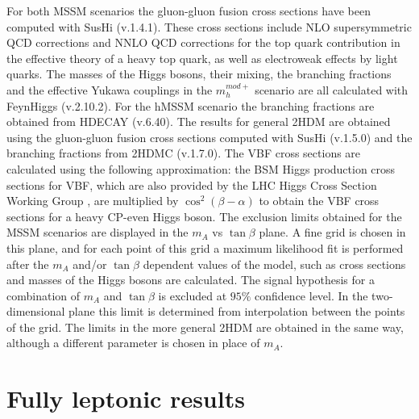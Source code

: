 For both MSSM scenarios the gluon-gluon fusion cross sections have been computed with SusHi (v.1.4.1)\cite{Harlander:2012pb}. These cross sections include NLO supersymmetric QCD corrections and NNLO QCD corrections for the top quark contribution in the effective theory of a heavy top quark, as well as electroweak effects by light quarks. The masses of the Higgs bosons, their mixing, the branching fractions and the effective Yukawa couplings in the $m_{h}^{mod+}$ scenario are all calculated with FeynHiggs (v.2.10.2)\cite{Heinemeyer:1998yj, Heinemeyer:1998np, Degrassi:2002fi, Frank:2006yh, Hahn:2013ria}. For the hMSSM scenario the branching fractions are obtained from HDECAY (v.6.40)\cite{Djouadi:1997yw, Djouadi:2006bz}. The results for general 2HDM are obtained using the gluon-gluon fusion cross sections computed with SusHi (v.1.5.0) and the branching fractions from 2HDMC (v.1.7.0)\cite{Rathsman:2011yv}. The VBF cross sections are calculated using the following approximation: the BSM Higgs production cross sections for VBF, which are also provided by the LHC Higgs Cross Section Working Group \cite{bsmhiggsxsecs2}, are multiplied by $\cos^{2}(\beta-\alpha)$ to obtain the VBF cross sections for a heavy CP-even Higgs boson.\newline
The exclusion limits obtained for the MSSM scenarios are displayed in the $m_{A}$ vs $\tan\beta$ plane. A fine grid is chosen in this plane, and for each point of this grid a maximum likelihood fit is performed after the $m_{A}$ and/or $\tan\beta$ dependent values of the model, such as cross sections and masses of the Higgs bosons are calculated. 
The signal hypothesis for a combination of $m_{A}$ and $\tan\beta$ is excluded at $95\%$ confidence level. In the two-dimensional plane this limit is determined from interpolation between the points of the grid. The limits in the more general 2HDM are obtained in the same way, although a different parameter is chosen in place of $m_{A}$.



\section{Fully leptonic results}

